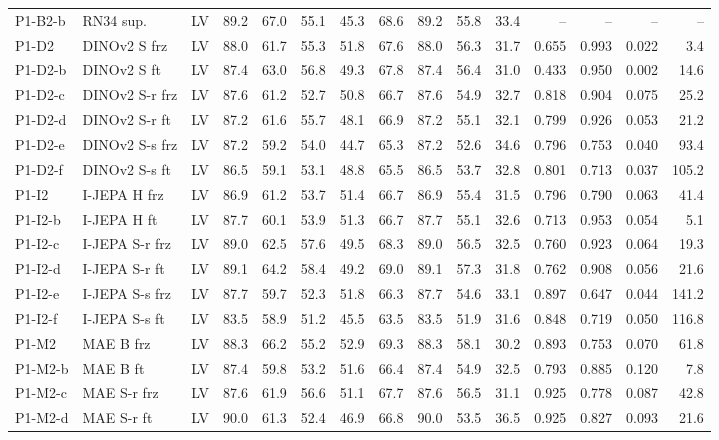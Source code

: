 \begin{longtable}{@{}l>{\raggedright\arraybackslash}p{2.2cm}crrrrrrrrrrrr@{}}
P1-B2-b & RN34 sup. & LV & 89.2 & 67.0 & 55.1 & 45.3 & 68.6 & 89.2 & 55.8 & 33.4 & -- & -- & -- & -- \\
P1-D2 & DINOv2 S frz & LV & 88.0 & 61.7 & 55.3 & 51.8 & 67.6 & 88.0 & 56.3 & 31.7 & 0.655 & 0.993 & 0.022 & 3.4 \\
P1-D2-b & DINOv2 S ft & LV & 87.4 & 63.0 & 56.8 & 49.3 & 67.8 & 87.4 & 56.4 & 31.0 & 0.433 & 0.950 & 0.002 & 14.6 \\
P1-D2-c & DINOv2 S-r frz & LV & 87.6 & 61.2 & 52.7 & 50.8 & 66.7 & 87.6 & 54.9 & 32.7 & 0.818 & 0.904 & 0.075 & 25.2 \\
P1-D2-d & DINOv2 S-r ft & LV & 87.2 & 61.6 & 55.7 & 48.1 & 66.9 & 87.2 & 55.1 & 32.1 & 0.799 & 0.926 & 0.053 & 21.2 \\
P1-D2-e & DINOv2 S-s frz & LV & 87.2 & 59.2 & 54.0 & 44.7 & 65.3 & 87.2 & 52.6 & 34.6 & 0.796 & 0.753 & 0.040 & 93.4 \\
P1-D2-f & DINOv2 S-s ft & LV & 86.5 & 59.1 & 53.1 & 48.8 & 65.5 & 86.5 & 53.7 & 32.8 & 0.801 & 0.713 & 0.037 & 105.2 \\
P1-I2 & I-JEPA H frz & LV & 86.9 & 61.2 & 53.7 & 51.4 & 66.7 & 86.9 & 55.4 & 31.5 & 0.796 & 0.790 & 0.063 & 41.4 \\
P1-I2-b & I-JEPA H ft & LV & 87.7 & 60.1 & 53.9 & 51.3 & 66.7 & 87.7 & 55.1 & 32.6 & 0.713 & 0.953 & 0.054 & 5.1 \\
P1-I2-c & I-JEPA S-r frz & LV & 89.0 & 62.5 & 57.6 & 49.5 & 68.3 & 89.0 & 56.5 & 32.5 & 0.760 & 0.923 & 0.064 & 19.3 \\
P1-I2-d & I-JEPA S-r ft & LV & 89.1 & 64.2 & 58.4 & 49.2 & 69.0 & 89.1 & 57.3 & 31.8 & 0.762 & 0.908 & 0.056 & 21.6 \\
P1-I2-e & I-JEPA S-s frz & LV & 87.7 & 59.7 & 52.3 & 51.8 & 66.3 & 87.7 & 54.6 & 33.1 & 0.897 & 0.647 & 0.044 & 141.2 \\
P1-I2-f & I-JEPA S-s ft & LV & 83.5 & 58.9 & 51.2 & 45.5 & 63.5 & 83.5 & 51.9 & 31.6 & 0.848 & 0.719 & 0.050 & 116.8 \\
P1-M2 & MAE B frz & LV & 88.3 & 66.2 & 55.2 & 52.9 & 69.3 & 88.3 & 58.1 & 30.2 & 0.893 & 0.753 & 0.070 & 61.8 \\
P1-M2-b & MAE B ft & LV & 87.4 & 59.8 & 53.2 & 51.6 & 66.4 & 87.4 & 54.9 & 32.5 & 0.793 & 0.885 & 0.120 & 7.8 \\
P1-M2-c & MAE S-r frz & LV & 87.6 & 61.9 & 56.6 & 51.1 & 67.7 & 87.6 & 56.5 & 31.1 & 0.925 & 0.778 & 0.087 & 42.8 \\
P1-M2-d & MAE S-r ft & LV & 90.0 & 61.3 & 52.4 & 46.9 & 66.8 & 90.0 & 53.5 & 36.5 & 0.925 & 0.827 & 0.093 & 21.6 \\

\end{longtable}
